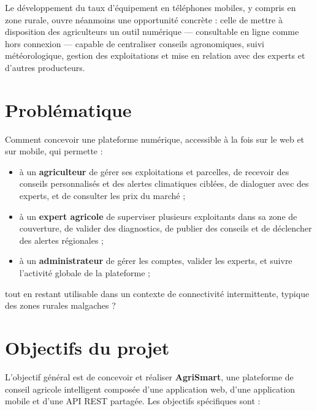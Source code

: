 \documentclass[12pt,a4paper]{report}
\begin{document}
Le développement du taux d'équipement en téléphones mobiles, y compris en zone rurale, ouvre néanmoins une opportunité concrète : celle de mettre à disposition des agriculteurs un outil numérique --- consultable en ligne comme hors connexion --- capable de centraliser conseils agronomiques, suivi météorologique, gestion des exploitations et mise en relation avec des experts et d'autres producteurs.

\section{Problématique}

Comment concevoir une plateforme numérique, accessible à la fois sur le web et sur mobile, qui permette :
\begin{itemize}
    \item à un \textbf{agriculteur} de gérer ses exploitations et parcelles, de recevoir des conseils personnalisés et des alertes climatiques ciblées, de dialoguer avec des experts, et de consulter les prix du marché ;
    \item à un \textbf{expert agricole} de superviser plusieurs exploitants dans sa zone de couverture, de valider des diagnostics, de publier des conseils et de déclencher des alertes régionales ;
    \item à un \textbf{administrateur} de gérer les comptes, valider les experts, et suivre l'activité globale de la plateforme ;
\end{itemize}
tout en restant utilisable dans un contexte de connectivité intermittente, typique des zones rurales malgaches ?

\section{Objectifs du projet}

L'objectif général est de concevoir et réaliser \textbf{AgriSmart}, une plateforme de conseil agricole intelligent composée d'une application web, d'une application mobile et d'une API REST partagée. Les objectifs spécifiques sont :
\end{document}
